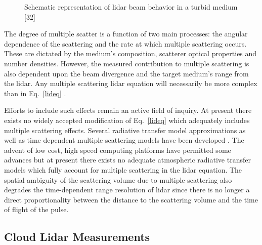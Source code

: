 \begin{figure}
\vspace{4.0in}
\caption{Schematic representation of lidar beam
behavior in a turbid medium [32]}
\end{figure}

The degree of multiple scatter is a function of 
two main processes: the angular dependence of the scattering
and the rate at which multiple scattering occurs.
These are dictated by the medium's composition,
scatterer optical properties and number densities.
However, the measured contribution to multiple scattering
is also dependent upon the beam divergence and
the target medium's range from the lidar. Any multiple 
scattering lidar equation will necessarily be more complex 
than in Eq.~{\ref{lideq}} \cite{lrbdlh} \cite{cwjshhhgd}.

Efforts to include such effects remain an active field 
of inquiry. At present there exists no widely accepted modification of
Eq.~{\ref{lideq}} which adequately includes multiple scattering effects.
Several radiative transfer model approximations as well
as time dependent multiple scattering models have been developed
\cite{kekjaw}\cite{jvdjg}\cite{dgcwgbmbwhgh}. 
The advent of low cost, 
high speed computing platforms have permitted some
advances but at present 
there exists no adequate atmospheric radiative
transfer models which fully account for multiple scattering 
in the lidar equation. 
The spatial ambiguity of the scattering volume
due to multiple scattering 
also degrades the time-dependent range resolution of lidar
since there is no longer a direct proportionality between the distance
to the scattering volume and the time of flight of the pulse.

%
\subsection{Cloud Lidar Measurements}

